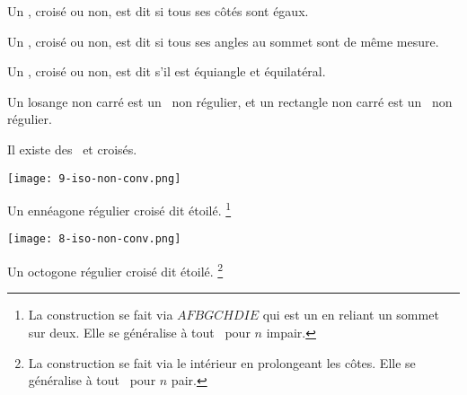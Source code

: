 

\begin{defi}
	Un \ngone, croisé ou non, est dit  si tous ses côtés sont égaux.
\end{defi}


\begin{defi}
	Un \ngone, croisé ou non, est dit  si tous ses angles au sommet sont de même mesure.
\end{defi}


\begin{defi}
	Un \ngone, croisé ou non, est dit  s'il est équiangle et équilatéral.
\end{defi}


\begin{remark}
	Un losange non carré est un \nequi\ non régulier, et un rectangle non carré est un \niso\ non régulier.
\end{remark}


\begin{remark}
	Il existe des \nregs\ et croisés.

    \vspace{-1.5em}
    
    \begin{multicols}{2}
    	\small\itshape\centering
    	
	    \null\vfill

	    \texttt{[image: 9-iso-non-conv.png]}
    
        \smallskip
        Un ennéagone régulier croisé dit étoilé.%
	    \footnote{
	        La construction se fait via $AFBGCHDIE$ qui est un  en reliant un sommet sur deux. Elle se généralise à tout \nreg\ pour $n$ impair.
	    }


    	\columnbreak
	
	    \null\vfill
	    
	    \texttt{[image: 8-iso-non-conv.png]}
    
        \smallskip
        Un octogone régulier croisé dit étoilé.%
	    \footnote{
	        La construction se fait via le  intérieur en prolongeant les côtes. Elle se généralise à tout \nreg\ pour $n$ pair.
	    }

    \end{multicols}
\end{remark}
